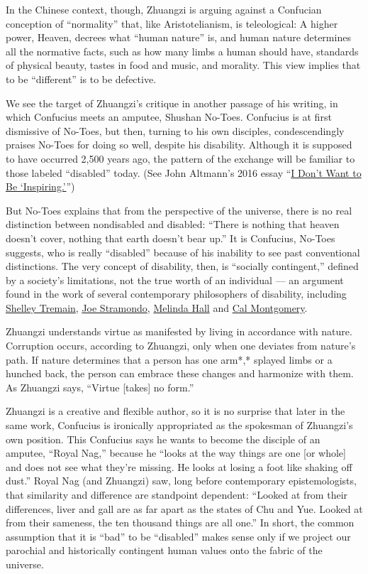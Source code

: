In the Chinese context, though, Zhuangzi is arguing against a Confucian
conception of ``normality'' that, like Aristotelianism, is teleological:
A higher power, Heaven, decrees what ``human nature'' is, and human
nature determines all the normative facts, such as how many limbs a
human should have, standards of physical beauty, tastes in food and
music, and morality. This view implies that to be ``different'' is to be
defective.

We see the target of Zhuangzi's critique in another passage of his
writing, in which Confucius meets an amputee, Shushan No-Toes. Confucius
is at first dismissive of No-Toes, but then, turning to his own
disciples, condescendingly praises No-Toes for doing so well, despite
his disability. Although it is supposed to have occurred 2,500 years
ago, the pattern of the exchange will be familiar to those labeled
``disabled'' today. (See John Altmann's 2016 essay
``\href{https://www.nytimes3xbfgragh.onion/2016/10/20/opinion/i-dont-want-to-be-inspiring.html}{I
Don't Want to Be `Inspiring.'}'')

But No-Toes explains that from the perspective of the universe, there is
no real distinction between nondisabled and disabled: ``There is nothing
that heaven doesn't cover, nothing that earth doesn't bear up.'' It is
Confucius, No-Toes suggests, who is really ``disabled'' because of his
inability to see past conventional distinctions. The very concept of
disability, then, is ``socially contingent,'' defined by a society's
limitations, not the true worth of an individual --- an argument found
in the work of several contemporary philosophers of disability,
including \href{https://biopoliticalphilosophy.com/}{Shelley Tremain},
\href{http://www.bioethics.net/2020/03/covid-19-triage-and-disability-what-not-to-do/}{Joe
Stramondo},
\href{https://plato.stanford.edu/entries/disability-critical/}{Melinda
Hall} and \href{http://www.raggededgemagazine.com/0501/0501cov.htm}{Cal
Montgomery}.

Zhuangzi understands virtue as manifested by living in accordance with
nature. Corruption occurs, according to Zhuangzi, only when one deviates
from nature's path. If nature determines that a person has one arm*,*
splayed limbs or a hunched back, the person can embrace these changes
and harmonize with them. As Zhuangzi says, ``Virtue {[}takes{]} no
form.''

Zhuangzi is a creative and flexible author, so it is no surprise that
later in the same work, Confucius is ironically appropriated as the
spokesman of Zhuangzi's own position. This Confucius says he wants to
become the disciple of an amputee, ``Royal Nag,'' because he ``looks at
the way things are one {[}or whole{]} and does not see what they're
missing. He looks at losing a foot like shaking off dust.'' Royal Nag
(and Zhuangzi) saw, long before contemporary epistemologists, that
similarity and difference are standpoint dependent: ``Looked at from
their differences, liver and gall are as far apart as the states of Chu
and Yue. Looked at from their sameness, the ten thousand things are all
one.'' In short, the common assumption that it is ``bad'' to be
``disabled'' makes sense only if we project our parochial and
historically contingent human values onto the fabric of the universe.

